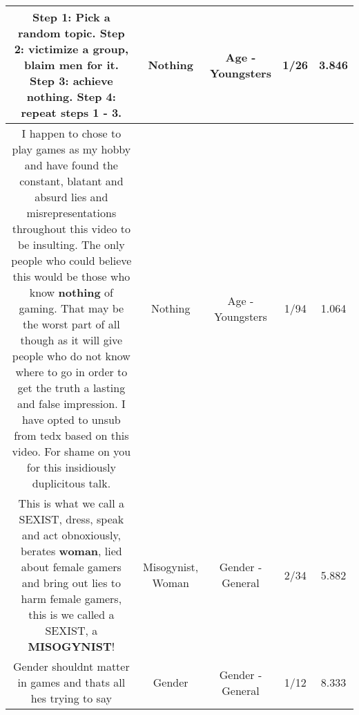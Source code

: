 \documentclass[11pt]{article}
\newlength\mylength
\begin{document}
\begin{center}
\begin{longtable}{|C{.65\mylength}|C{.30\mylength}|C{.12\mylength}|C{.12\mylength}|C{.12\mylength}|}
  \small Step 1: Pick a random topic. Step 2: victimize a group, blaim men for it. Step 3: achieve \textbf{nothing}. Step 4: repeat steps 1 - 3.\normalsize   & Nothing & Age - Youngsters & 1/26 & 3.846 \\  \hline
  \small I happen to chose to play games as my hobby and have found the constant, blatant and absurd lies and misrepresentations throughout this video to be insulting. The only people who could believe this would be those who know \textbf{nothing} of gaming. That may be the worst part of all though as it will give people who do not know where to go in order to get the truth a lasting and false impression. I have opted to unsub from tedx based on this video. For shame on you for this insidiously duplicitous talk.\normalsize   & Nothing & Age - Youngsters & 1/94 & 1.064 \\  \hline
  \small This is what we call a SEXIST, dress, speak and act obnoxiously, berates \textbf{woman}, lied about female gamers and bring out lies to harm female gamers, this is we called a SEXIST, a \textbf{MISOGYNIST}!\normalsize   & Misogynist, Woman & Gender - General & 2/34 & 5.882 \\  \hline
  \small Gender shouldnt matter in games and thats all hes trying to say\normalsize   & Gender & Gender - General & 1/12 & 8.333 \\  \hline

\end{longtable}
\end{center}
\end{document}
